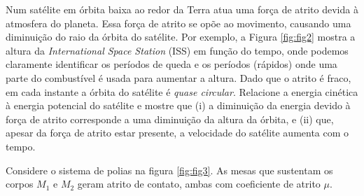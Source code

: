 \documentclass[]{IMTexam}
\begin{document}
\begin{questions}



	\question Num satélite em órbita baixa ao redor da Terra atua uma força de atrito devida à atmosfera do planeta. Essa força de atrito se opõe ao movimento, causando uma diminuição do raio da órbita do satélite. Por exemplo, a Figura \ref{fig:fig2} mostra a altura da \textit{International Space Station} (ISS) em função do tempo, onde podemos claramente identificar os períodos de queda e os períodos (rápidos) onde uma parte do combustível é usada para aumentar a altura. Dado que o atrito é fraco, em cada instante a órbita do satélite é \textit{quase circular}. Relacione a energia cinética à energia potencial do satélite e mostre que (i) a diminuição da energia devido à força de atrito corresponde a uma diminuição da altura da órbita, e (ii) que, apesar da força de atrito estar presente, a velocidade do satélite aumenta com o tempo.

	\begin{solution}

	\end{solution}

	\clearpage

	\question Considere o sistema de polias na figura \ref{fig:fig3}. As mesas que sustentam os corpos $ M_1 $ e $ M_2 $ geram atrito de contato, ambas com coeficiente de atrito $\mu$.


\end{questions}
\end{document}
